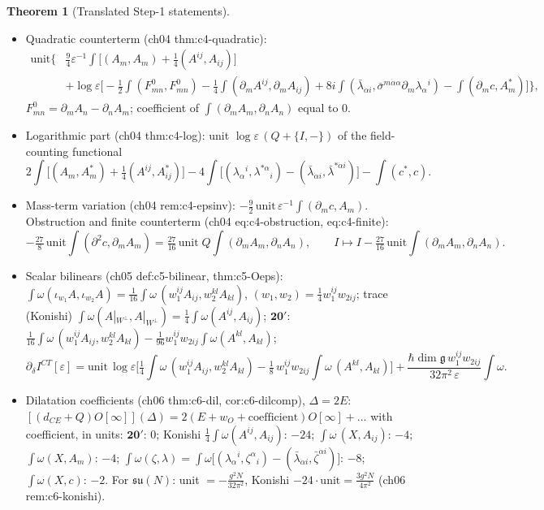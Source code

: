 \documentclass[11pt]{article}
\theoremstyle{definition}
\newtheorem{theorem}[definition]{Theorem}
\begin{document}
\begin{theorem}[Translated Step-1 statements]\label{thm:step1}\leavevmode
\begin{itemize}
\item Quadratic counterterm (ch04 thm:c4-quadratic):
\[
\begin{aligned}\text{unit}\Big\{&\tfrac94\varepsilon^{-1}\!\int\!\Big[(A_m,A_m)+\tfrac14(A^{ij},A_{ij})\Big]\\
&+\log\varepsilon\Big[-\tfrac12\!\int\!(F^0_{mn},F^0_{mn})-\tfrac14\!\int\!(\partial_mA^{ij},\partial_mA_{ij})+8i\!\int\!(\bar\lambda_{\dot\alpha i},\bar\sigma^{m\dot\alpha\alpha}\partial_m\lambda_\alpha{}^i)-\!\int\!(\partial_mc,A^*_m)\Big]\Big\},\end{aligned}
\]
$F^0_{mn}=\partial_mA_n-\partial_nA_m$; coefficient of $\int(\partial_mA_m,\partial_nA_n)$ equal to $0$.
\item Logarithmic part (ch04 thm:c4-log): unit $\log\varepsilon\,(Q+\{I,-\})$ of the field-counting functional
\[
2\!\int\!\Big[(A_m,A^*_m)+\tfrac14(A^{ij},A^*_{ij})\Big]-4\!\int\!\Big[(\lambda_\alpha{}^i,\lambda^{*\alpha}{}_i)-(\bar\lambda_{\dot\alpha i},\bar\lambda^{*\dot\alpha i})\Big]-\!\int\!(c^*,c).
\]
\item Mass-term variation (ch04 rem:c4-epsinv): $-\tfrac92\,\text{unit}\,\varepsilon^{-1}\int(\partial_mc,A_m)$. Obstruction and finite counterterm (ch04 eq:c4-obstruction, eq:c4-finite):
\[
-\tfrac{27}8\,\text{unit}\int(\partial^2c,\partial_mA_m)=\tfrac{27}{16}\,\text{unit}\;Q\!\int(\partial_mA_m,\partial_nA_n),\qquad I\mapsto I-\tfrac{27}{16}\,\text{unit}\int(\partial_mA_m,\partial_nA_n).
\]
\item Scalar bilinears (ch05 def:c5-bilinear, thm:c5-Oeps): $\int\omega(\iota_{w_1}A,\iota_{w_2}A)=\tfrac1{16}\int\omega\,(w_1^{ij}A_{ij},w_2^{kl}A_{kl})$, $(w_1,w_2)=\tfrac14w_1^{ij}w_{2ij}$; trace (Konishi) $\int\omega(A|_{W^\perp},A|_{W^\perp})=\tfrac14\int\omega(A^{ij},A_{ij})$; $\mathbf{20'}$: $\tfrac1{16}\int\omega\,(w_1^{ij}A_{ij},w_2^{kl}A_{kl})-\tfrac1{96}w_1^{ij}w_{2ij}\int\omega(A^{kl},A_{kl})$;
\[
\partial_\delta I^{CT}[\varepsilon]=\text{unit}\,\log\varepsilon\Big[\tfrac14\!\int\!\omega\,(w_1^{ij}A_{ij},w_2^{kl}A_{kl})-\tfrac18\,w_1^{ij}w_{2ij}\int\omega\,(A^{kl},A_{kl})\Big]+\frac{\hbar\dim\mathfrak g\,w_1^{ij}w_{2ij}}{32\pi^2\,\varepsilon}\int\omega .
\]
\item Dilatation coefficients (ch06 thm:c6-dil, cor:c6-dilcomp), $\Delta=2E$: $[(d_{CE}+Q)O[\infty]](\Delta)=2(E+w_O+\text{coefficient})O[\infty]+\dots$ with coefficient, in units: $\mathbf{20'}$: $0$; Konishi $\tfrac14\int\omega(A^{ij},A_{ij})$: $-24$; $\int\omega\,(X,A_{ij})$: $-4$; $\int\omega(X,A_m)$: $-4$; $\int\omega(\zeta,\lambda)=\int\omega\big[(\lambda_\alpha{}^i,\zeta^\alpha{}_i)-(\bar\lambda_{\dot\alpha i},\bar\zeta^{\dot\alpha i})\big]$: $-8$; $\int\omega(X,c)$: $-2$. For $\mathfrak{su}(N)$: unit $=-\tfrac{g^2N}{32\pi^2}$, Konishi $-24\cdot\text{unit}=\tfrac{3g^2N}{4\pi^2}$ (ch06 rem:c6-konishi).
\end{itemize}
\end{theorem}
\end{document}
